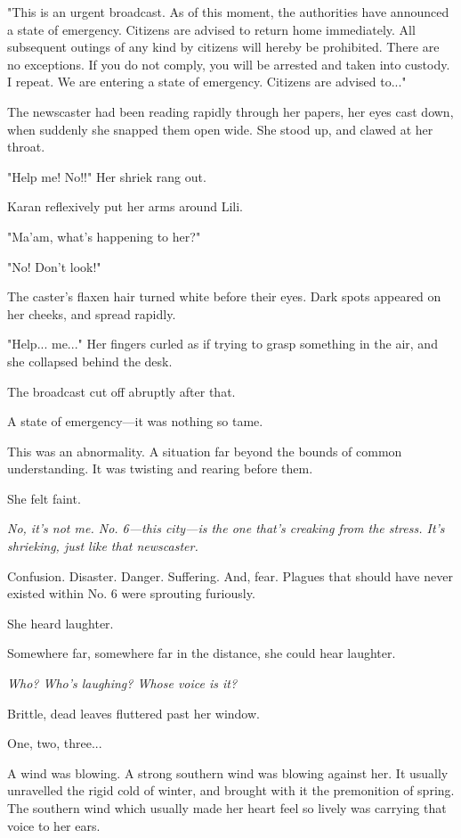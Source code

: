 "This is an urgent broadcast. As of this moment, the authorities have
announced a state of emergency. Citizens are advised to return home
immediately. All subsequent outings of any kind by citizens will hereby
be prohibited. There are no exceptions. If you do not comply, you will
be arrested and taken into custody. I repeat. We are entering a state of
emergency. Citizens are advised to..."

The newscaster had been reading rapidly through her papers, her eyes
cast down, when suddenly she snapped them open wide. She stood up, and
clawed at her throat.

"Help me! No!!" Her shriek rang out.

Karan reflexively put her arms around Lili.

"Ma'am, what's happening to her?"

"No! Don't look!"

The caster's flaxen hair turned white before their eyes. Dark spots
appeared on her cheeks, and spread rapidly.

"Help... me..." Her fingers curled as if trying to grasp something in
the air, and she collapsed behind the desk.

The broadcast cut off abruptly after that.

A state of emergency---it was nothing so tame.

This was an abnormality. A situation far beyond the bounds of common
understanding. It was twisting and rearing before them.

She felt faint.

\emph{No, it's not me. No. 6---this city---is the one that's creaking from the
stress. It's shrieking, just like that newscaster.}

Confusion. Disaster. Danger. Suffering. And, fear. Plagues that should
have never existed within No. 6 were sprouting furiously.

She heard laughter.

Somewhere far, somewhere far in the distance, she could hear laughter.

\emph{Who? Who's laughing? Whose voice is it?}

Brittle, dead leaves fluttered past her window.

One, two, three...

A wind was blowing. A strong southern wind was blowing against her. It
usually unravelled the rigid cold of winter, and brought with it the
premonition of spring. The southern wind which usually made her heart
feel so lively was carrying that voice to her ears.

